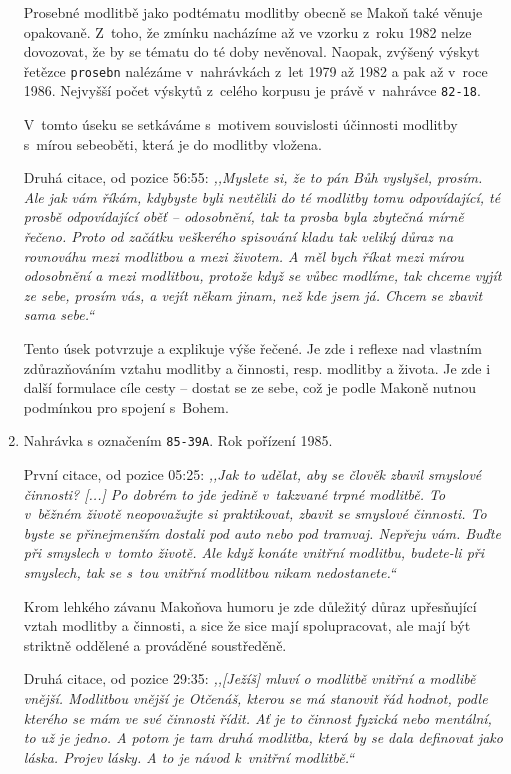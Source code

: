 \begin{enumerate}
{    Prosebné modlitbě jako podtématu modlitby obecně se Makoň také věnuje
    opakovaně. Z~toho, že zmínku nacházíme až ve vzorku z~roku 1982 nelze
    dovozovat, že by se tématu do té doby nevěnoval. Naopak, zvýšený výskyt
    řetězce \texttt{prosebn} nalézáme v~nahrávkách z~let 1979 až 1982 a pak až
    v~roce 1986. Nejvyšší počet výskytů z~celého korpusu je právě v~nahrávce
    \texttt{82-18}.

    V~tomto úseku se setkáváme s~motivem souvislosti účinnosti modlitby s~mírou
    sebeoběti, která je do modlitby vložena.

    Druhá citace, od pozice 56:55: \textit{%
      ,,Myslete si, že to pán Bůh vyslyšel, prosím. Ale jak vám říkám, kdybyste
      byli nevtělili do té modlitby tomu odpovídající, té prosbě odpovídající
      oběť -- odosobnění, tak ta prosba byla zbytečná mírně řečeno. Proto od
      začátku veškerého spisování kladu tak veliký důraz na rovnováhu mezi
      modlitbou a mezi životem. A měl bych říkat mezi mírou odosobnění a mezi
      modlitbou, protože když se vůbec modlíme, tak chceme vyjít ze sebe, prosím
      vás, a vejít někam jinam, než kde jsem já. Chcem se zbavit sama sebe.``
    }

    Tento úsek potvrzuje a explikuje výše řečené. Je zde i reflexe nad vlastním
    zdůrazňováním vztahu modlitby a činnosti, resp. modlitby a života. Je zde i
    další formulace cíle cesty -- dostat se ze sebe, což je podle Makoně nutnou
    podmínkou pro spojení s~Bohem.
  }
  \item{
    Nahrávka s označením \texttt{85-39A}.
    Rok pořízení 1985.

    První citace, od pozice 05:25: \textit{%
      ,,Jak to udělat, aby se člověk zbavil smyslové činnosti? [...] Po dobrém to
      jde jedině v~takzvané trpné modlitbě. To v~běžném životě neopovažujte si
      praktikovat, zbavit se smyslové činnosti. To byste se přinejmenším dostali
      pod auto nebo pod tramvaj. Nepřeju vám. Buďte při smyslech v~tomto životě.
      Ale když konáte vnitřní modlitbu, budete-li při smyslech, tak se s~tou
      vnitřní modlitbou nikam nedostanete.``
    }

    Krom lehkého závanu Makoňova humoru je zde důležitý důraz upřesňující vztah
    modlitby a činnosti, a sice že sice mají spolupracovat, ale mají být
    striktně oddělené a prováděné soustředěně.

    Druhá citace, od pozice 29:35: \textit{%
      ,,[Ježíš] mluví o modlitbě vnitřní a modlibě vnější. Modlitbou vnější je
      Otčenáš, kterou se má stanovit řád hodnot, podle kterého se mám ve své
      činnosti řídit. Ať je to činnost fyzická nebo mentální, to už je jedno. A
      potom je tam druhá modlitba, která by se dala definovat jako láska. Projev
      lásky. A to je návod k~vnitřní modlitbě.``
    }

}
\end{enumerate}
